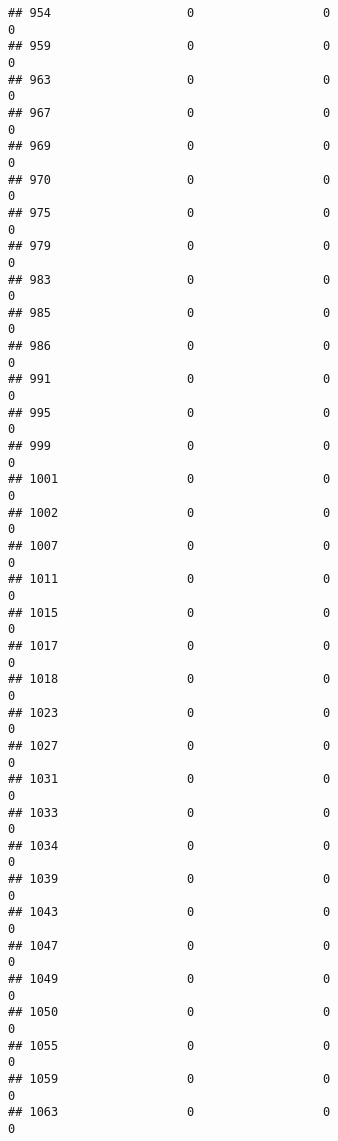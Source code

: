 \documentclass[
]{article}
\begin{document}
\begin{verbatim}
## 954                   0                  0                              0
## 959                   0                  0                              0
## 963                   0                  0                              0
## 967                   0                  0                              0
## 969                   0                  0                              0
## 970                   0                  0                              0
## 975                   0                  0                              0
## 979                   0                  0                              0
## 983                   0                  0                              0
## 985                   0                  0                              0
## 986                   0                  0                              0
## 991                   0                  0                              0
## 995                   0                  0                              0
## 999                   0                  0                              0
## 1001                  0                  0                              0
## 1002                  0                  0                              0
## 1007                  0                  0                              0
## 1011                  0                  0                              0
## 1015                  0                  0                              0
## 1017                  0                  0                              0
## 1018                  0                  0                              0
## 1023                  0                  0                              0
## 1027                  0                  0                              0
## 1031                  0                  0                              0
## 1033                  0                  0                              0
## 1034                  0                  0                              0
## 1039                  0                  0                              0
## 1043                  0                  0                              0
## 1047                  0                  0                              0
## 1049                  0                  0                              0
## 1050                  0                  0                              0
## 1055                  0                  0                              0
## 1059                  0                  0                              0
## 1063                  0                  0                              0

\end{verbatim}
\end{document}
